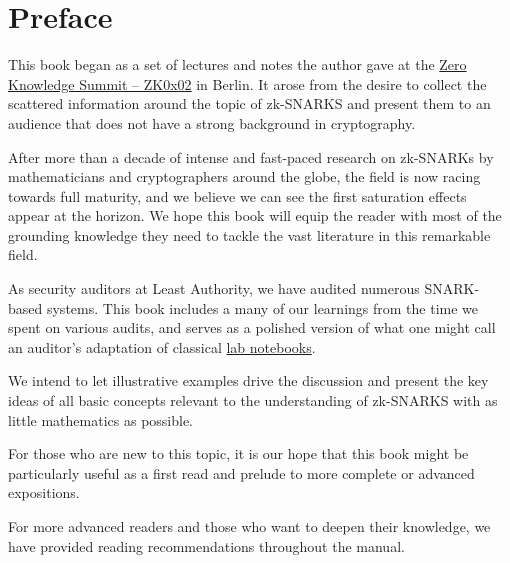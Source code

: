 \chapter*{Preface}

This book began as a set of lectures and notes the author gave at the \href{https://www.zksummit.com/}{Zero Knowledge Summit – ZK0x02} in Berlin. It arose from the desire to collect the scattered information around the topic of zk-SNARKS and present them to an audience that does not have a strong background in cryptography.

After more than a decade of intense and fast-paced research on zk-SNARKs by mathematicians
and cryptographers around the globe, the field is now racing towards full maturity, and we believe we can see the first saturation effects appear at the horizon. We hope this book will equip the reader with most
of the grounding knowledge they need to tackle the vast literature in this
remarkable field.

As security auditors at Least Authority, we have audited numerous SNARK-based systems. This book includes a many of our learnings from the time we spent on various audits, and serves as a polished version of what one might call an auditor's adaptation of classical \href{https://en.wikipedia.org/wiki/Lab_notebook}{lab notebooks}.  

We intend to let illustrative examples drive the discussion and present the key ideas of all basic concepts relevant to the understanding of zk-SNARKS with as little mathematics as possible. 

For those who are new to this topic, it is our hope that this book might be particularly useful as a first read and prelude to more complete or advanced expositions.

For more advanced
readers and those who want to deepen their knowledge, we have provided reading recommendations throughout the manual.


